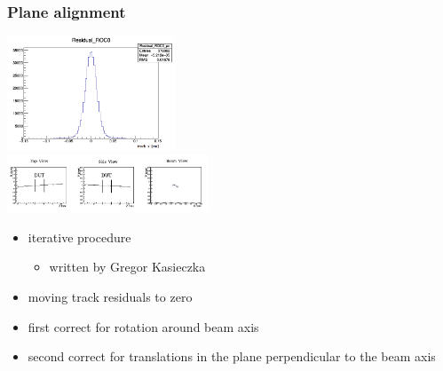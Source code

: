 \documentclass[9pt]{beamer}
\begin{document}
\begin{frame}
	\frametitle{Plane alignment}
	\begin{center}
		\begin{minipage}{6cm}
			\centering
			\includegraphics[width=5cm]{Residual}\\
			\includegraphics[width=6cm]{Track}
		\end{minipage}
		\begin{minipage}[c][.5\textheight]{5cm}
			\begin{itemize}
				\setlength{\itemsep}{\fill}
				\item iterative procedure 
				\begin{itemize}
					\item written by Gregor Kasieczka 
				\end{itemize}
				\item moving track residuals to zero
				\item first correct for rotation around beam axis
				\item second correct for translations in the plane perpendicular to the beam axis
			\end{itemize}
		\end{minipage}
	\end{center}
\end{frame}
\end{document}
